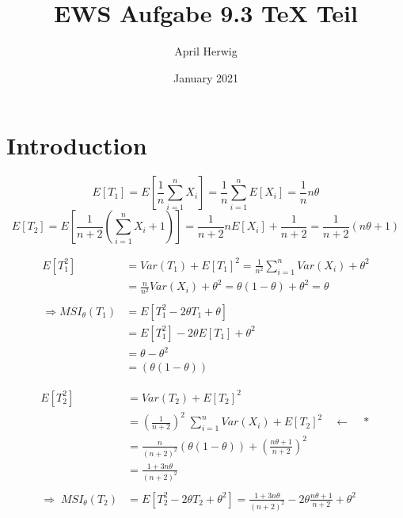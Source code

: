 \documentclass[draft]{article}
\title{EWS Aufgabe 9.3 TeX Teil}
\author{April Herwig}
\date{January 2021}
\begin{document}
\maketitle

\section{Introduction}


$$E[T_1] = E[\frac{1}{n} \sum\limits_{i=1}^{n} X_i] = \frac{1}{n}\sum\limits_{i=1}^n E[X_i] = \frac{1}{n} n \theta
$$
$$E[T_2] = E[\frac{1}{n+2} \left( \sum\limits_{i=1}^{n}X_i + 1 \right) ] = \frac{1}{n+2} n E[X_i] + \frac{1}{n+2} = \frac{1}{n+2}(n\theta + 1)
$$

\begin{equation*}
\begin{split}
E[T_1^2] & = Var(T_1) + E[T_1]^2 = \frac{1}{n^2} \sum\limits_{i=1}^{n} Var(X_i) + \theta ^2 \\ 
& = \frac{n}{n^2} Var(X_i) + \theta ^2 = \theta(1-\theta) + \theta ^2 = \theta \\
\\
\Rightarrow MSI_{\theta}(T_1) & = E[T_1^2 - 2 \theta T_1 + \theta] \\
& = E[T_1^2] - 2 \theta E[T_1] + \theta^2 \\
& = \theta - \theta^2 \\
& = (\theta(1-\theta))
\end{split}
\end{equation*}

\begin{equation*}
\begin{split}
E[T_2^2] & = Var(T_2) + E[T_2]^2 \\
& = \left(\frac{1}{n+2}\right)^2\; \sum\limits_{i=1}^{n} Var(X_i) + E[T_2]^2 \quad\leftarrow \quad * \\
& = \frac{n}{(n+2)^2} (\theta(1-\theta)) + \left(\frac{n\theta +1}{n+2}\right)^2 \\
& = \frac{1 + 3n\theta}{(n+2)^2} \\
\\
\Rightarrow\; MSI_{\theta}(T_2) & = E[T_2^2 -2\theta T_2  + \theta ^2] = \frac{1 + 3n\theta}{(n+2)^2} - 2\theta\frac{n\theta +1}{n+2} + \theta ^2\\
\end{split}
\end{equation*}
\end{document}
